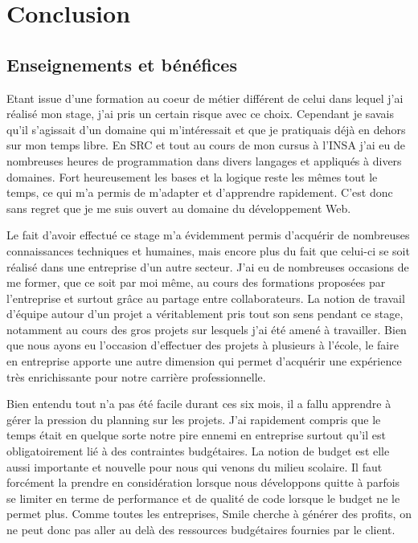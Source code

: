 \documentclass[a4paper,11pt,twoside]{report}
\begin{document}
\chapter*{Conclusion}
  \section*{Enseignements et bénéfices}
  Etant issue d'une formation au coeur de métier différent de celui dans lequel j'ai réalisé mon stage, j'ai pris un certain risque avec ce choix. Cependant je savais qu'il s'agissait d'un domaine qui m'intéressait et que je pratiquais déjà en dehors sur mon temps libre. En SRC et tout au cours de mon cursus à l'INSA j'ai eu de nombreuses heures de programmation dans divers langages et appliqués à divers domaines. Fort heureusement les bases et la logique reste les mêmes tout le temps, ce qui m'a permis de m'adapter et d'apprendre rapidement. C'est donc sans regret que je me suis ouvert au domaine du développement Web.
  
  Le fait d'avoir effectué ce stage m'a évidemment permis d'acquérir de nombreuses connaissances techniques et humaines, mais encore plus du fait que celui-ci se soit réalisé dans une entreprise d'un autre secteur. J'ai eu de nombreuses occasions de me former, que ce soit par moi même, au cours des formations proposées par l'entreprise et surtout grâce au partage entre collaborateurs. La notion de travail d'équipe autour d'un projet a véritablement pris tout son sens pendant ce stage, notamment au cours des gros projets sur lesquels j'ai été amené à travailler. Bien que nous ayons eu l'occasion d'effectuer des projets à plusieurs à l'école, le faire en entreprise apporte une autre dimension qui permet d'acquérir une expérience très enrichissante pour notre carrière professionnelle.
  
  Bien entendu tout n'a pas été facile durant ces six mois, il a fallu apprendre à gérer la pression du planning sur les projets. J'ai rapidement compris que le temps était en quelque sorte notre pire ennemi en entreprise surtout qu'il est obligatoirement lié à des contraintes budgétaires. La notion de budget est elle aussi importante et nouvelle pour nous qui venons du milieu scolaire. Il faut forcément la prendre en considération lorsque nous développons quitte à parfois se limiter en terme de performance et de qualité de code lorsque le budget ne le permet plus. Comme toutes les entreprises, Smile cherche à générer des profits, on ne peut donc pas aller au delà des ressources budgétaires fournies par le client.
  
\end{document}

